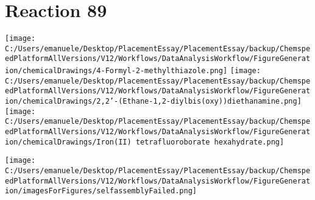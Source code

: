 \documentclass{article}%
\begin{document}
\section*{Reaction 89}%
%
\begin{scheme}[H]%
\begin{minipage}{0.5\textwidth}%
\texttt{[image: C:/Users/emanuele/Desktop/PlacementEssay/PlacementEssay/backup/ChemspeedPlatformAllVersions/V12/Workflows/DataAnalysisWorkflow/FigureGeneration/chemicalDrawings/4-Formyl-2-methylthiazole.png]}%
\texttt{[image: C:/Users/emanuele/Desktop/PlacementEssay/PlacementEssay/backup/ChemspeedPlatformAllVersions/V12/Workflows/DataAnalysisWorkflow/FigureGeneration/chemicalDrawings/2,2'-(Ethane-1,2-diylbis(oxy))diethanamine.png]}%
\texttt{[image: C:/Users/emanuele/Desktop/PlacementEssay/PlacementEssay/backup/ChemspeedPlatformAllVersions/V12/Workflows/DataAnalysisWorkflow/FigureGeneration/chemicalDrawings/Iron(II) tetrafluoroborate hexahydrate.png]}%
\end{minipage}%
\begin{minipage}{0.5\textwidth}%
\begin{center}%
\texttt{[image: C:/Users/emanuele/Desktop/PlacementEssay/PlacementEssay/backup/ChemspeedPlatformAllVersions/V12/Workflows/DataAnalysisWorkflow/FigureGeneration/imagesForFigures/selfassemblyFailed.png]}%
\end{center}%
\end{minipage}%
\caption{Self-assembly of components 1, 19, with Iron(II) in a 3.0:1.5:1.0 molar ratio in CH$_3$CN at 60\textdegree C for 40h. These are the reagents (starting materials) for reaction 89.}%
\end{scheme}%
\end{document}
